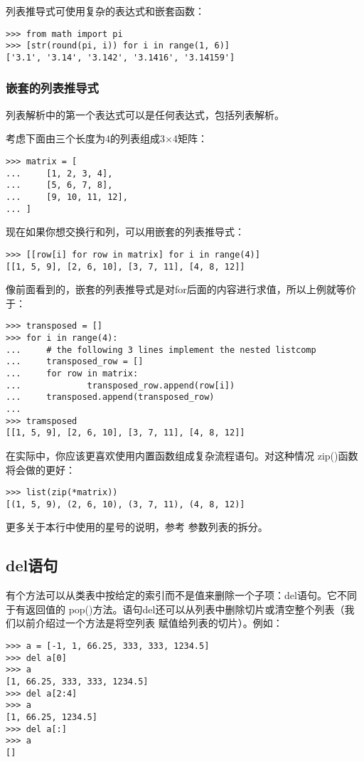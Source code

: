 \documentclass[UTF8]{ctexart}
\begin{document}
列表推导式可使用复杂的表达式和嵌套函数：
\begin{verbatim}
>>> from math import pi
>>> [str(round(pi, i)) for i in range(1, 6)]
['3.1', '3.14', '3.142', '3.1416', '3.14159']
\end{verbatim}
\subsubsection{嵌套的列表推导式}
列表解析中的第一个表达式可以是任何表达式，包括列表解析。

考虑下面由三个长度为4的列表组成3$\times$4矩阵：
\begin{verbatim}
>>> matrix = [
...     [1, 2, 3, 4],
...     [5, 6, 7, 8],
...     [9, 10, 11, 12],
... ]
\end{verbatim}

现在如果你想交换行和列，可以用嵌套的列表推导式：
\begin{verbatim}
>>> [[row[i] for row in matrix] for i in range(4)]
[[1, 5, 9], [2, 6, 10], [3, 7, 11], [4, 8, 12]]
\end{verbatim}

像前面看到的，嵌套的列表推导式是对for后面的内容进行求值，所以上例就等价于：
\begin{verbatim}
>>> transposed = []
>>> for i in range(4):
...     # the following 3 lines implement the nested listcomp
...     transposed_row = []
...     for row in matrix:
...             transposed_row.append(row[i])
...     transposed.append(transposed_row)
...
>>> tramsposed
[[1, 5, 9], [2, 6, 10], [3, 7, 11], [4, 8, 12]]
\end{verbatim}

在实际中，你应该更喜欢使用内置函数组成复杂流程语句。对这种情况 zip()函数将会做的更好：
\begin{verbatim}
>>> list(zip(*matrix))
[(1, 5, 9), (2, 6, 10), (3, 7, 11), (4, 8, 12)]
\end{verbatim}

更多关于本行中使用的星号的说明，参考 参数列表的拆分。
\subsection{del语句}
有个方法可以从类表中按给定的索引而不是值来删除一个子项：del语句。它不同于有返回值的
pop()方法。语句del还可以从列表中删除切片或清空整个列表（我们以前介绍过一个方法是将空列表
赋值给列表的切片）。例如：
\begin{verbatim}
>>> a = [-1, 1, 66.25, 333, 333, 1234.5]
>>> del a[0]
>>> a
[1, 66.25, 333, 333, 1234.5]
>>> del a[2:4]
>>> a
[1, 66.25, 1234.5]
>>> del a[:]
>>> a
[]
\end{verbatim}
\end{document}
